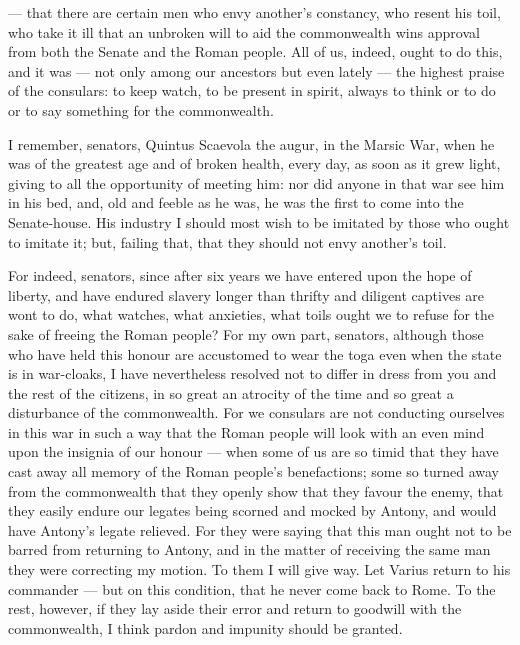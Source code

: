  --- that there are certain men who envy another's constancy, who resent his toil, who take it ill that an unbroken will to aid the commonwealth wins approval from both the Senate and the Roman people. All of us, indeed, ought to do this, and it was --- not only among our ancestors but even lately --- the highest praise of the consulars: to keep watch, to be present in spirit, always to think or to do or to say something for the commonwealth.

 I remember, senators, Quintus Scaevola the augur, in the Marsic War, when he was of the greatest age and of broken health, every day, as soon as it grew light, giving to all the opportunity of meeting him: nor did anyone in that war see him in his bed, and, old and feeble as he was, he was the first to come into the Senate-house. His industry I should most wish to be imitated by those who ought to imitate it; but, failing that, that they should not envy another's toil.

 For indeed, senators, since after six years we have entered upon the hope of liberty, and have endured slavery longer than thrifty and diligent captives are wont to do, what watches, what anxieties, what toils ought we to refuse for the sake of freeing the Roman people? For my own part, senators, although those who have held this honour are accustomed to wear the toga even when the state is in war-cloaks, I have nevertheless resolved not to differ in dress from you and the rest of the citizens, in so great an atrocity of the time and so great a disturbance of the commonwealth. For we consulars are not conducting ourselves in this war in such a way that the Roman people will look with an even mind upon the insignia of our honour --- when some of us are so timid that they have cast away all memory of the Roman people's benefactions; some so turned away from the commonwealth that they openly show that they favour the enemy, that they easily endure our legates being scorned and mocked by Antony, and would have Antony's legate relieved. For they were saying that this man ought not to be barred from returning to Antony, and in the matter of receiving the same man they were correcting my motion. To them I will give way. Let Varius return to his commander --- but on this condition, that he never come back to Rome. To the rest, however, if they lay aside their error and return to goodwill with the commonwealth, I think pardon and impunity should be granted.

